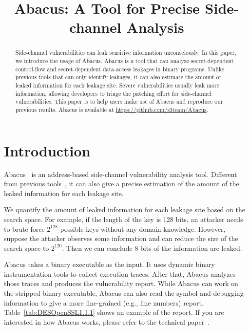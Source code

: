 \documentclass[10pt,conference]{IEEEtran}
\newcommand{\tool}{\textsf{Abacus}}
\begin{document}
\title{\tool{}: A Tool for Precise Side-channel Analysis}
\author{
}


\maketitle

\begin{abstract}
Side-channel vulnerabilities can leak sensitive information unconsciously. 
In this paper, we introduce the usage of Abacus. Abacus is a tool that can analyze secret-dependent control-flow and secret-dependent data-access leakages in binary programs. Unlike previous tools that can only identify leakages, it can also estimate the amount of leaked information for each leakage site. Severe vulnerabilities usually leak more information, allowing developers to triage the patching effort for side-channel vulnerabilities. This paper is to help users make use of Abacus and reproduce our previous
results. Abacus is available at \url{https://github.com/s3team/Abacus}.
\end{abstract}

\IEEEpeerreviewmaketitle
{}
\pagestyle{plain}
\section{Introduction}


\tool{}~\cite{bao2021abacus} is an address-based side-channel vulnerability analysis tool. Different from previous tools~\cite{203878,236338,182946}, it can also give a precise estimation of the amount of the leaked information for each leakage site.

We quantify the amount of leaked information for each leakage site based on the search space. For example, if the length of the key is 128 bits, an attacker needs to brute force $2^{128}$ possible keys without any domain knowledge. However, suppose the attacker observes some information and can reduce the size of the search space to $2^{120}$. Then we can conclude 8 bits of the information are leaked.

\tool{} takes a binary executable as the input. It uses dynamic binary instrumentation tools to collect execution traces. After that, \tool{} analyzes those traces and produces the vulnerability report. While \tool{} can work on the stripped binary executable, \tool{} can also read the symbol and debugging information to give a more fine-grained (e.g., line numbers) report. Table~\ref{tab:DESOpenSSL1.1.1} shows an example of the report. If you are interested in how \tool{} works, please refer to the technical paper~\cite{bao2021abacus}.
\end{document}
